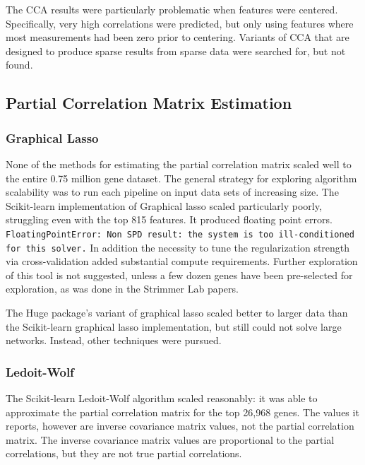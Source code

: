 The CCA results were particularly problematic when features were centered.
Specifically, very high correlations were predicted, but only using features where most measurements had been zero prior to centering.
Variants of CCA that are designed to produce sparse results from sparse data were searched for, but not found.

\subsection{Partial Correlation Matrix Estimation}

\subsubsection{Graphical Lasso}
None of the methods for estimating the partial correlation matrix scaled well to the entire 0.75 million gene dataset.
The general strategy for exploring algorithm scalability was to run each pipeline on input data sets of increasing size.
The Scikit-learn implementation of Graphical lasso scaled particularly poorly, struggling even with the top 815 features.
It produced floating point errors. %
\texttt{FloatingPointError: Non SPD result: the system is too ill-conditioned for this solver.} %
In addition the necessity to tune the regularization strength via cross-validation added substantial compute requirements.
Further exploration of this tool is not suggested, unless a few dozen genes have been pre-selected for exploration, as was done in the Strimmer Lab papers.

The Huge package's variant of graphical lasso scaled better to larger data than the Scikit-learn graphical lasso implementation, but still could not solve large networks.
Instead, other techniques were pursued.

\subsubsection{Ledoit-Wolf}
The Scikit-learn Ledoit-Wolf algorithm scaled reasonably: it was able to approximate the partial correlation matrix for the top 26,968 genes.
The values it reports, however are inverse covariance matrix values, not the partial correlation matrix.
The inverse covariance matrix values are proportional to the partial correlations, but they are not true partial correlations.

